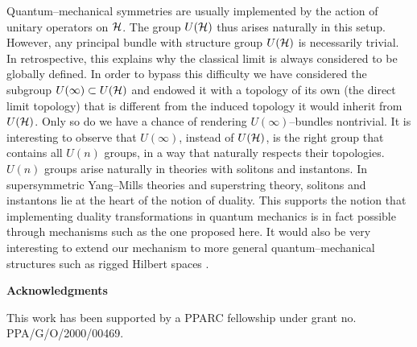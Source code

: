 \documentclass[a4paper,a4paper]{article}
\begin{document}
Quantum--mechanical symmetries are usually implemented by the action of 
unitary operators on ${\cal H}$. The group $U({\cal H})$ thus arises naturally 
in this setup. However, any principal bundle with structure group 
$U({\cal H})$ is necessarily trivial. In retrospective, this explains 
why the classical limit is always considered to be globally defined. 
In order to bypass this difficulty we have considered the subgroup 
$U(\infty)\subset U({\cal H})$ and endowed it with a topology of its own 
(the direct limit topology) that is different from the induced topology 
it would inherit from $U({\cal H})$. Only so do we have a chance of 
rendering $U(\infty)$--bundles nontrivial. It is interesting to observe that
$U(\infty)$, instead of $U({\cal H})$, is the right group that contains all $U(n)$ groups, 
in a way that naturally respects their topologies. $U(n)$ groups arise 
naturally in theories with solitons and instantons.
In supersymmetric Yang--Mills theories and superstring theory, solitons and instantons 
lie at the heart of the notion of duality. This supports the notion that implementing 
duality transformations in quantum mechanics is in fact possible through mechanisms 
such as the one proposed here. It would also be very interesting to extend our mechanism 
to more general quantum--mechanical structures such as rigged Hilbert spaces \cite{GADELLA}. 



{\bf Acknowledgments}

This work has been supported by a PPARC fellowship under grant no. 
PPA/G/O/2000/00469.
\end{document}
